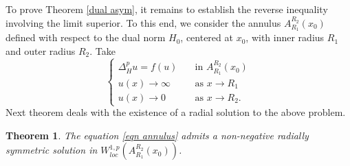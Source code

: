 \documentclass[11pt]{amsart}
\newtheorem{theorem}{Theorem}[section]
\numberwithin{equation}{section}
\begin{document}
    To prove Theorem \ref{dual asym}, it remains to establish the reverse inequality involving the limit superior. To this end, we consider the annulus $A_{R_{1}}^{R_{2}}(x_{0})$ defined with respect to the dual norm $H_{0}$, centered at $x_{0}$, with inner radius $R_{1}$ and outer radius $R_{2}$. Take 
   \begin{equation}\label{eqn annulus}
       \begin{cases}
           \Delta_{H}^{p}u=f(u)\quad &\text{in }A_{R_{1}}^{R_{2}}(x_{0})\\
           u(x)\to \infty &\text{as } x\to R_{1}\\
           u(x)\to 0 &\text{as } x\to R_{2}.
       \end{cases}
   \end{equation}
   Next theorem deals with the existence of a radial solution to the above problem.
   \begin{theorem}\label{existence on annulus}
       The equation \eqref{eqn annulus} admits a non-negative radially symmetric solution in $W_{loc}^{1,p}(A_{R_{1}}^{R_{2}}(x_{0}))$.
   \end{theorem}
\end{document}
